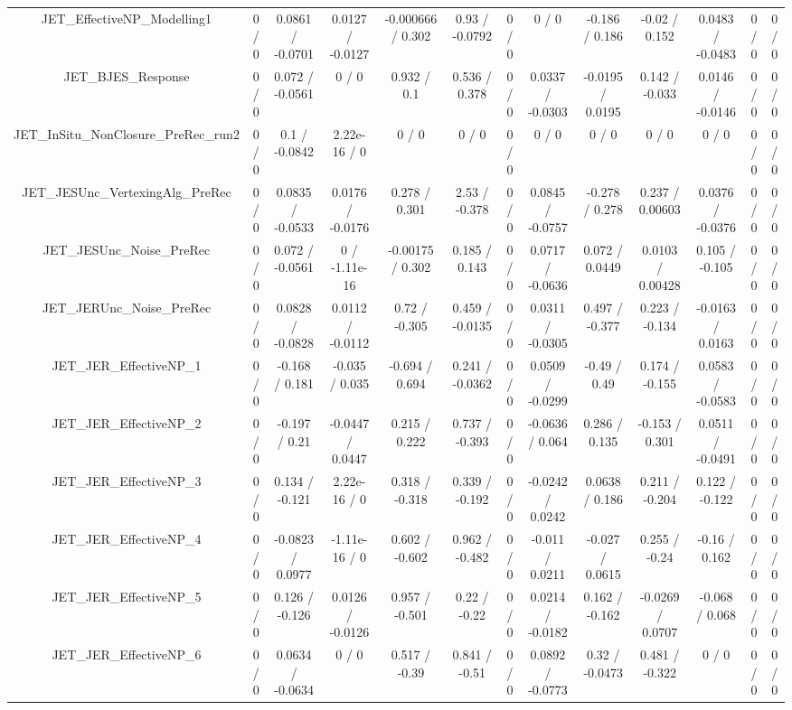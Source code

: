 \documentclass[10pt]{article}
\begin{document}
\begin{table}[htbp]
\begin{center}
\begin{tabular}{|c|c|c|c|c|c|c|c|c|c|c|c|c|}
  JET_EffectiveNP_Modelling1 & 0 / 0 & 0.0861 / -0.0701 & 0.0127 / -0.0127 & -0.000666 / 0.302 & 0.93 / -0.0792 & 0 / 0 & 0 / 0 & -0.186 / 0.186 & -0.02 / 0.152 & 0.0483 / -0.0483 & 0 / 0 & 0 / 0 \\ 
  JET_BJES_Response & 0 / 0 & 0.072 / -0.0561 & 0 / 0 & 0.932 / 0.1 & 0.536 / 0.378 & 0 / 0 & 0.0337 / -0.0303 & -0.0195 / 0.0195 & 0.142 / -0.033 & 0.0146 / -0.0146 & 0 / 0 & 0 / 0 \\ 
  JET_InSitu_NonClosure_PreRec_run2 & 0 / 0 & 0.1 / -0.0842 & 2.22e-16 / 0 & 0 / 0 & 0 / 0 & 0 / 0 & 0 / 0 & 0 / 0 & 0 / 0 & 0 / 0 & 0 / 0 & 0 / 0 \\ 
  JET_JESUnc_VertexingAlg_PreRec & 0 / 0 & 0.0835 / -0.0533 & 0.0176 / -0.0176 & 0.278 / 0.301 & 2.53 / -0.378 & 0 / 0 & 0.0845 / -0.0757 & -0.278 / 0.278 & 0.237 / 0.00603 & 0.0376 / -0.0376 & 0 / 0 & 0 / 0 \\ 
  JET_JESUnc_Noise_PreRec & 0 / 0 & 0.072 / -0.0561 & 0 / -1.11e-16 & -0.00175 / 0.302 & 0.185 / 0.143 & 0 / 0 & 0.0717 / -0.0636 & 0.072 / 0.0449 & 0.0103 / 0.00428 & 0.105 / -0.105 & 0 / 0 & 0 / 0 \\ 
  JET_JERUnc_Noise_PreRec & 0 / 0 & 0.0828 / -0.0828 & 0.0112 / -0.0112 & 0.72 / -0.305 & 0.459 / -0.0135 & 0 / 0 & 0.0311 / -0.0305 & 0.497 / -0.377 & 0.223 / -0.134 & -0.0163 / 0.0163 & 0 / 0 & 0 / 0 \\ 
  JET_JER_EffectiveNP_1 & 0 / 0 & -0.168 / 0.181 & -0.035 / 0.035 & -0.694 / 0.694 & 0.241 / -0.0362 & 0 / 0 & 0.0509 / -0.0299 & -0.49 / 0.49 & 0.174 / -0.155 & 0.0583 / -0.0583 & 0 / 0 & 0 / 0 \\ 
  JET_JER_EffectiveNP_2 & 0 / 0 & -0.197 / 0.21 & -0.0447 / 0.0447 & 0.215 / 0.222 & 0.737 / -0.393 & 0 / 0 & -0.0636 / 0.064 & 0.286 / 0.135 & -0.153 / 0.301 & 0.0511 / -0.0491 & 0 / 0 & 0 / 0 \\ 
  JET_JER_EffectiveNP_3 & 0 / 0 & 0.134 / -0.121 & 2.22e-16 / 0 & 0.318 / -0.318 & 0.339 / -0.192 & 0 / 0 & -0.0242 / 0.0242 & 0.0638 / 0.186 & 0.211 / -0.204 & 0.122 / -0.122 & 0 / 0 & 0 / 0 \\ 
  JET_JER_EffectiveNP_4 & 0 / 0 & -0.0823 / 0.0977 & -1.11e-16 / 0 & 0.602 / -0.602 & 0.962 / -0.482 & 0 / 0 & -0.011 / 0.0211 & -0.027 / 0.0615 & 0.255 / -0.24 & -0.16 / 0.162 & 0 / 0 & 0 / 0 \\ 
  JET_JER_EffectiveNP_5 & 0 / 0 & 0.126 / -0.126 & 0.0126 / -0.0126 & 0.957 / -0.501 & 0.22 / -0.22 & 0 / 0 & 0.0214 / -0.0182 & 0.162 / -0.162 & -0.0269 / 0.0707 & -0.068 / 0.068 & 0 / 0 & 0 / 0 \\ 
  JET_JER_EffectiveNP_6 & 0 / 0 & 0.0634 / -0.0634 & 0 / 0 & 0.517 / -0.39 & 0.841 / -0.51 & 0 / 0 & 0.0892 / -0.0773 & 0.32 / -0.0473 & 0.481 / -0.322 & 0 / 0 & 0 / 0 & 0 / 0 \\ 

\end{tabular}
\end{center}
\end{table}
\end{document}
